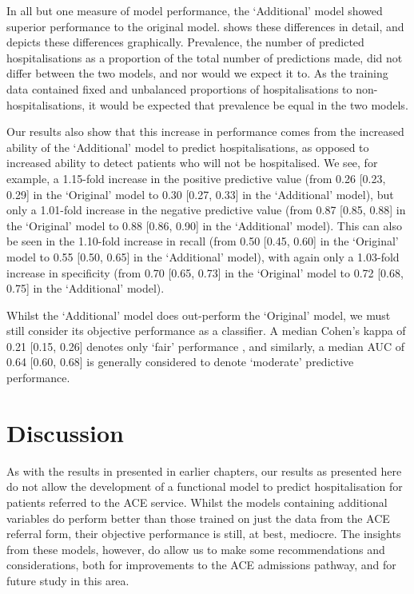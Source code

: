 In all but one measure of model performance, the `Additional' model showed superior performance to the original model.  shows these differences in detail, and  depicts these differences graphically. Prevalence, the number of predicted hospitalisations as a proportion of the total number of predictions made, did not differ between the two models, and nor would we expect it to. As the training data contained fixed and unbalanced proportions of hospitalisations to non-hospitalisations, it would be expected that prevalence be equal in the two models.

Our results also show that this increase in performance comes from the increased ability of the `Additional' model to predict hospitalisations, as opposed to increased ability to detect patients who will not be hospitalised. We see, for example, a 1.15-fold increase in the positive predictive value (from 0.26 [0.23, 0.29] in the `Original' model to 0.30 [0.27, 0.33] in the `Additional' model), but only a 1.01-fold increase in the negative predictive value (from 0.87 [0.85, 0.88] in the `Original' model to 0.88 [0.86, 0.90] in the `Additional' model). This can also be seen in the 1.10-fold increase in recall (from  0.50 [0.45, 0.60] in the `Original' model to 0.55 [0.50, 0.65] in the `Additional' model), with again only a 1.03-fold increase in specificity (from  0.70 [0.65, 0.73] in the `Original' model to 0.72 [0.68, 0.75] in the `Additional' model).

Whilst the `Additional' model does out-perform the `Original' model, we must still consider its objective performance as a classifier. A median Cohen's kappa of 0.21 [0.15, 0.26] denotes only `fair' performance \cite{Landis1977}, and similarly, a median AUC of 0.64 [0.60, 0.68] is generally considered to denote `moderate' predictive performance.

\section{Discussion}

As with the results in presented in earlier chapters, our results as presented here do not allow the development of a functional model to predict hospitalisation for patients referred to the ACE service. Whilst the models containing additional variables do perform better than those trained on just the data from the ACE referral form, their objective performance is still, at best, mediocre. The insights from these models, however, do allow us to make some recommendations and considerations, both for improvements to the ACE admissions pathway, and for future study in this area.

